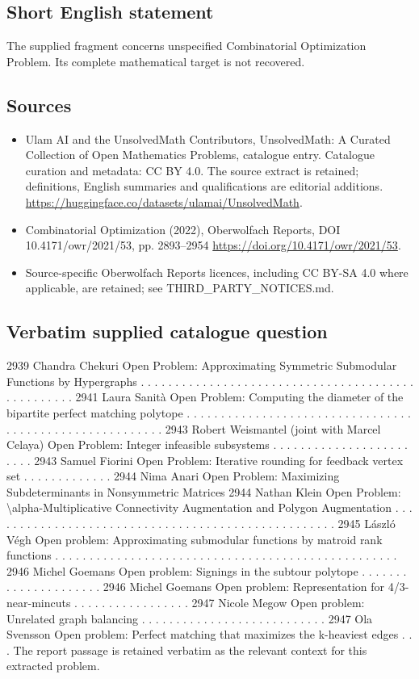 \documentclass[11pt]{article}
\begin{document}
\subsection{Short English statement}
The supplied fragment concerns unspecified Combinatorial Optimization Problem. Its complete mathematical target is not recovered.
\subsection{Sources}
\begin{itemize}
\item[S1] Ulam AI and the UnsolvedMath Contributors, UnsolvedMath: A Curated Collection of Open Mathematics Problems, catalogue entry. Catalogue curation and metadata: CC BY 4.0. The source extract is retained; definitions, English summaries and qualifications are editorial additions.
\url{https://huggingface.co/datasets/ulamai/UnsolvedMath}.
\item[S2] Combinatorial Optimization (2022), Oberwolfach Reports, DOI 10.4171/owr/2021/53, pp. 2893--2954
\url{https://doi.org/10.4171/owr/2021/53}.
\item Source-specific Oberwolfach Reports licences, including CC BY-SA 4.0 where applicable, are retained; see THIRD\_PARTY\_NOTICES.md.
\end{itemize}
\subsection{Verbatim supplied catalogue question}
2939 Chandra Chekuri Open Problem: Approximating Symmetric Submodular Functions by Hypergraphs . . . . . . . . . . . . . . . . . . . . . . . . . . . . . . . . . . . . . . . . . . . . . . . . . . 2941 Laura Sanità Open Problem: Computing the diameter of the bipartite perfect matching polytope . . . . . . . . . . . . . . . . . . . . . . . . . . . . . . . . . . . . . . . . . . . . . . . . . . . . . . . . 2943 Robert Weismantel (joint with Marcel Celaya) Open Problem: Integer infeasible subsystems . . . . . . . . . . . . . . . . . . . . . . . . 2943 Samuel Fiorini Open Problem: Iterative rounding for feedback vertex set . . . . . . . . . . . . . 2944 Nima Anari Open Problem: Maximizing Subdeterminants in Nonsymmetric Matrices 2944 Nathan Klein Open Problem: \textbackslash{}alpha-Multiplicative Connectivity Augmentation and Polygon Augmentation . . . . . . . . . . . . . . . . . . . . . . . . . . . . . . . . . . . . . . . . . . . . . . . . . . . 2945 László Végh Open problem: Approximating submodular functions by matroid rank functions . . . . . . . . . . . . . . . . . . . . . . . . . . . . . . . . . . . . . . . . . . . . . . . . . . 2946 Michel Goemans Open problem: Signings in the subtour polytope . . . . . . . . . . . . . . . . . . . . . 2946 Michel Goemans Open problem: Representation for 4/3-near-mincuts . . . . . . . . . . . . . . . . . 2947 Nicole Megow Open problem: Unrelated graph balancing . . . . . . . . . . . . . . . . . . . . . . . . . . . 2947 Ola Svensson Open problem: Perfect matching that maximizes the k-heaviest edges . . . The report passage is retained verbatim as the relevant context for this extracted problem.
\end{document}
